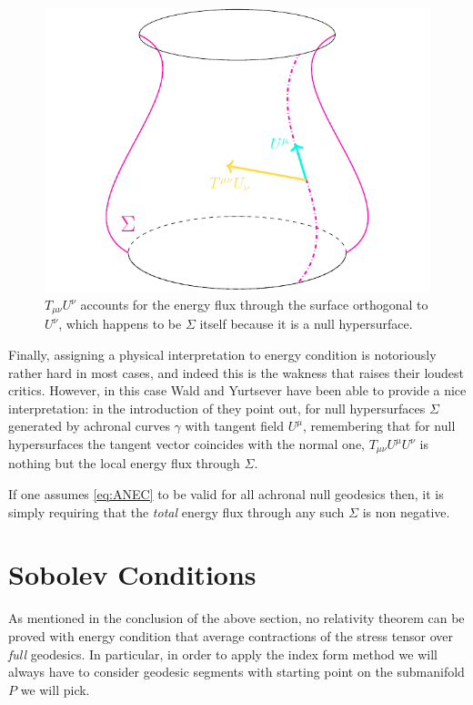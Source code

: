 \begin{figure}
    \centering
    \includegraphics[scale=0.65]{Immagini/ANEC/ANEC.pdf}
    \caption{\(T_{\mu\nu}U^{\nu}\) accounts for the energy flux through the surface orthogonal to \(U^{\nu}\), which happens to be \(\Sigma\) itself because it is a null hypersurface.}
    \label{fig:ANEC}
\end{figure}

Finally, assigning a physical interpretation to energy condition is notoriously rather hard in most cases, and indeed this is the wakness that raises their loudest critics.
However, in this case Wald and Yurtsever have been able to provide a nice interpretation: in the introduction of \cite[]{wald1991general} they point out, for null hypersurfaces \(\Sigma\) generated by achronal curves \(\gamma\) with tangent field \(U^{\mu}\), remembering that for null hypersurfaces the tangent vector coincides with the normal one, \(T_{\mu\nu}U^{\mu}U^{\nu}\) is nothing but the local energy flux through \(\Sigma\).

If one assumes \eqref{eq:ANEC} to be valid for all achronal null geodesics then, it is simply requiring that the \emph{total} energy flux through any such \(\Sigma\) is non negative.

\section{Sobolev Conditions}
\label{sec:sobolev-conditions}
As mentioned in the conclusion of the above section, no relativity theorem can be proved with energy condition that average contractions of the stress tensor over \emph{full} geodesics. In particular, in order to apply the index form method we will always have to consider geodesic segments with starting point on the submanifold \(P\) we will pick.

